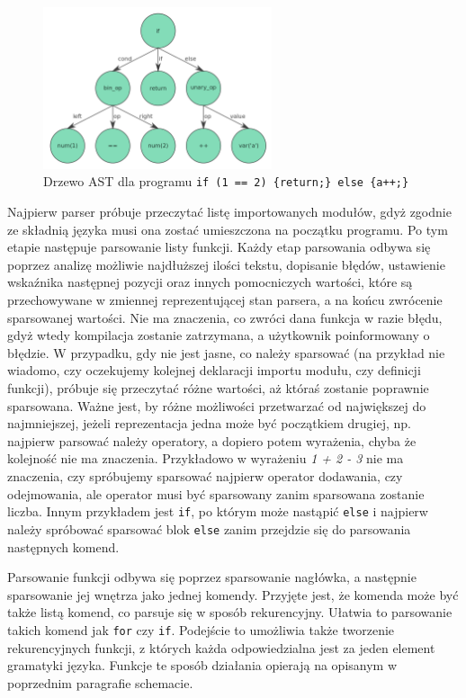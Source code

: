 \documentclass[licencjacka]{pracamgr}
\begin{document}
\begin{figure}[h]
  \centering
  \includegraphics[width=0.6\textwidth]{files/ast.png}
  \caption{Drzewo AST dla programu \texttt{if (1 == 2) \{return;\} else \{a++;\}}}
  \label{img:ast}
\end{figure}

Najpierw parser próbuje przeczytać listę importowanych modułów, gdyż zgodnie ze składnią języka musi ona zostać umieszczona na początku programu. Po
tym etapie następuje parsowanie listy funkcji. Każdy etap parsowania odbywa się poprzez analizę możliwie najdłuższej ilości tekstu, dopisanie błędów,
ustawienie wskaźnika następnej pozycji oraz innych pomocniczych wartości, które są przechowywane w zmiennej reprezentującej stan parsera, a na końcu
zwrócenie sparsowanej wartości. Nie ma znaczenia, co zwróci dana funkcja w razie błędu, gdyż wtedy kompilacja zostanie zatrzymana, a użytkownik
poinformowany o błędzie. W przypadku, gdy nie jest jasne, co należy sparsować (na przykład nie wiadomo, czy oczekujemy kolejnej deklaracji importu
modułu, czy definicji funkcji), próbuje się przeczytać różne wartości, aż któraś zostanie poprawnie sparsowana. Ważne jest, by różne możliwości
przetwarzać od największej do najmniejszej, jeżeli reprezentacja jedna może być początkiem drugiej, np. najpierw parsować należy operatory, a dopiero
potem wyrażenia, chyba że kolejność nie ma znaczenia. Przykładowo w wyrażeniu \emph{1 + 2 - 3} nie ma znaczenia, czy spróbujemy sparsować najpierw
operator dodawania, czy odejmowania, ale operator musi być sparsowany zanim sparsowana zostanie liczba. Innym przykładem jest \texttt{if}, po którym
może nastąpić \texttt{else} i najpierw należy spróbować sparsować blok \texttt{else} zanim przejdzie się do parsowania następnych komend.

Parsowanie funkcji odbywa się poprzez sparsowanie nagłówka, a następnie sparsowanie jej wnętrza jako jednej komendy. Przyjęte jest, że komenda może
być także listą komend, co parsuje się w sposób rekurencyjny. Ułatwia to parsowanie takich komend jak \texttt{for} czy \texttt{if}. Podejście to
umożliwia także tworzenie rekurencyjnych funkcji, z których każda odpowiedzialna jest za jeden element gramatyki języka. Funkcje te sposób działania
opierają na opisanym w poprzednim paragrafie schemacie.
\end{document}
